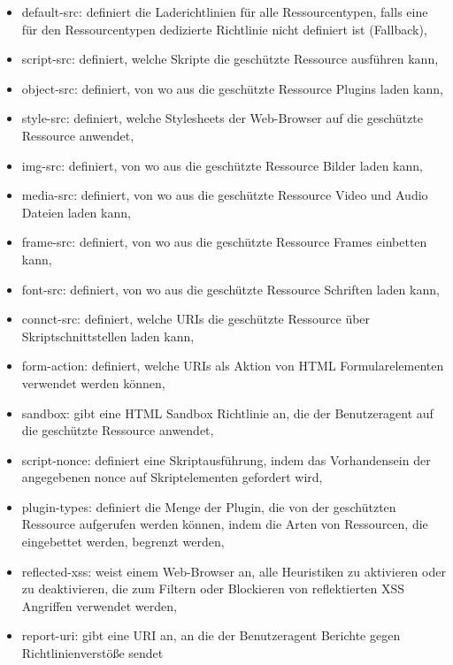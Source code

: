 \begin{itemize}
	\item default-src: \newline definiert die Laderichtlinien für alle Ressourcentypen, falls eine für den Ressourcentypen dedizierte Richtlinie nicht definiert ist (Fallback),
	\item script-src: \newline definiert, welche Skripte die geschützte Ressource ausführen kann,
	\item object-src: \newline definiert, von wo aus die geschützte Ressource Plugins laden kann,
	\item style-src: \newline definiert, welche Stylesheets der Web-Browser auf die geschützte Ressource anwendet,
	\item img-src: \newline definiert, von wo aus die geschützte Ressource Bilder laden kann,
	\item media-src: \newline definiert, von wo aus die geschützte Ressource Video und Audio Dateien laden kann,
	\item frame-src: \newline definiert, von wo aus die geschützte Ressource Frames einbetten kann,
	\item font-src: \newline definiert, von wo aus die geschützte Ressource Schriften laden kann,
	\item connct-src: \newline definiert, welche URIs die geschützte Ressource über Skriptschnittstellen laden kann,
	\item form-action: \newline definiert, welche URIs als Aktion von HTML Formularelementen verwendet werden können,
	\item sandbox: \newline gibt eine HTML Sandbox Richtlinie an, die der Benutzeragent auf die geschützte Ressource anwendet,
	\item script-nonce: \newline definiert eine Skriptausführung, indem das Vorhandensein der angegebenen nonce auf Skriptelementen gefordert wird,
	\item plugin-types: \newline definiert die Menge der Plugin, die von der geschützten Ressource aufgerufen werden können, indem die Arten von Ressourcen, die eingebettet werden, begrenzt werden,
	\item reflected-xss: \newline weist einem Web-Browser an, alle Heuristiken zu aktivieren oder zu deaktivieren, die zum Filtern oder Blockieren von reflektierten XSS Angriffen verwendet werden,
	\item report-uri: \newline gibt eine URI an, an die der Benutzeragent Berichte gegen Richtlinienverstöße sendet
\end{itemize}



